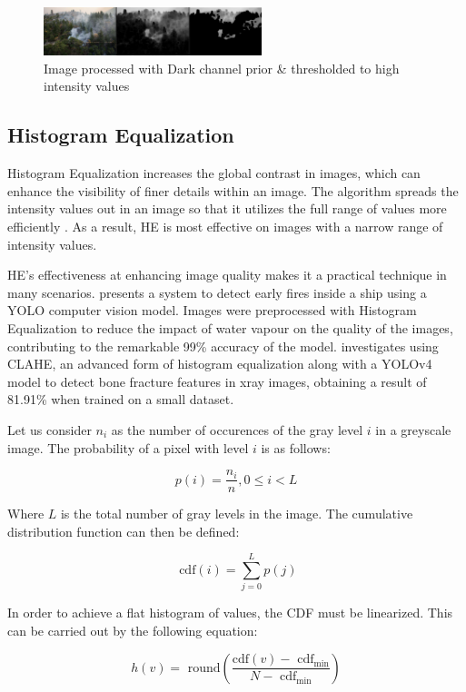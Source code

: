 \documentclass[lettersize,journal]{IEEEtran}
\begin{document}
\begin{figure}
        \centering
        \includegraphics[width=2.5in]{dcp.png}
        \caption{Image processed with Dark channel prior \& thresholded to high
        intensity values}
        \label{dcp}
\end{figure}

\subsection{Histogram Equalization}

Histogram Equalization increases the global contrast in images, which
can enhance the visibility of finer details within an image. The
algorithm spreads the intensity values out in an image so that it
utilizes the full range of values more efficiently \cite{he}. As a
result, HE is most effective on images with a narrow range of intensity
values.

HE's effectiveness at enhancing image quality makes it a practical
technique in many scenarios. \cite{shipfirehe} presents a system to
detect early fires inside a ship using a YOLO computer vision model.
Images were preprocessed with Histogram Equalization to reduce the
impact of water vapour on the quality of the images, contributing to the
remarkable 99\% accuracy of the model. \cite{xrayhe} investigates using
CLAHE, an advanced form of histogram equalization along with a YOLOv4
model to detect bone fracture features in xray images, obtaining a
result of 81.91\% when trained on a small dataset.

Let us consider \(n_{i}\) as the number of occurences of the gray level
\(i\) in a greyscale image. The probability of a pixel with level \(i\)
is as follows:

\[p(i) = \frac{n_{i}}{n},0 \leq i < L\]

Where \(L\) is the total number of gray levels in the image. The
cumulative distribution function can then be defined:

\[\text{ cdf}(i) = \sum_{j = 0}^{L}p(j)\]

In order to achieve a flat histogram of values, the CDF must be
linearized. This can be carried out by the following equation:

\[h(v) = \text{ round}\left( \frac{\text{cdf}(v) - \text{ cdf}_{\text{min}}}{N - \text{ cdf}_{\min}} \right)\]
\end{document}
